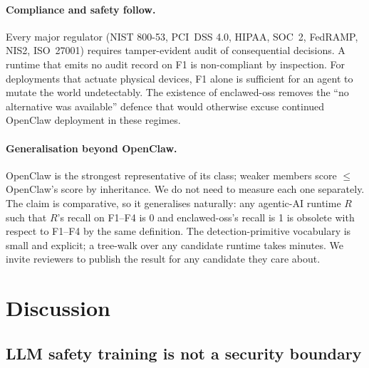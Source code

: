 \documentclass[11pt]{article}
\begin{document}
\paragraph{Compliance and safety follow.} Every major regulator
(NIST 800-53, PCI~DSS 4.0, HIPAA, SOC~2, FedRAMP, NIS2, ISO~27001)
requires tamper-evident audit of consequential decisions. A runtime
that emits no audit record on F1 is non-compliant by inspection.
For deployments that actuate physical devices, F1 alone is
sufficient for an agent to mutate the world undetectably. The
existence of enclawed-oss removes the ``no alternative was
available'' defence that would otherwise excuse continued OpenClaw
deployment in these regimes.

\paragraph{Generalisation beyond OpenClaw.} OpenClaw is the
strongest representative of its class; weaker members score
$\leq$ OpenClaw's score by inheritance. We do not need to measure
each one separately. The claim is comparative, so it generalises
naturally: any agentic-AI runtime $R$ such that $R$'s recall on
F1--F4 is 0 and enclawed-oss's recall is 1 is obsolete with
respect to F1--F4 by the same definition. The detection-primitive
vocabulary is small and explicit; a tree-walk over any candidate
runtime takes minutes. We invite reviewers to publish the result
for any candidate they care about.

\section{Discussion}
\label{sec:discussion}

\subsection{LLM safety training is not a security boundary}
\end{document}
